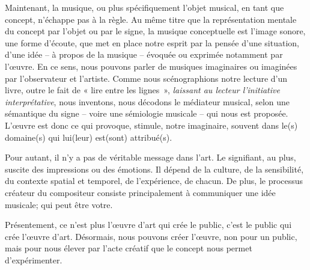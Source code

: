 Maintenant, la musique, ou plus spécifiquement l'objet musical, en tant que concept, n'échappe pas à la règle. Au même titre que la représentation mentale du concept par l'objet ou par le signe, la musique conceptuelle est l'image sonore, une forme d'écoute, que met en place notre esprit par la pensée d'une situation, d'une idée -- à propos de la musique -- évoquée ou exprimée notamment par l'œuvre. 
En ce sens, nous pouvons parler de musiques imaginaires ou imaginées par l'observateur et l'artiste. Comme nous scénographions notre lecture d'un livre, outre le fait de « lire entre les \hbox{lignes »}, \textit{laissant au lecteur l'initiative interprétative}, %
nous inventons, nous décodons le médiateur musical, selon une sémantique du signe -- voire une sémiologie musicale -- qui nous est proposée. L'œuvre est donc ce qui provoque, stimule, notre imaginaire, souvent dans le(s) domaine(s) qui lui(leur) est(sont) attribué(s). 
 
 Pour autant, il n'y a pas de véritable message dans l'art. Le signifiant, au plus, suscite des impressions ou des émotions. Il dépend de la culture, de la sensibilité, du contexte spatial et temporel, de l'expérience, de chacun.  De plus, le processus créateur du compositeur consiste principalement à communiquer une idée musicale; qui peut être votre.

Présentement, ce n’est plus l’œuvre d’art qui crée le public, c’est le public qui crée l’œuvre d’art. Désormais, nous pouvons créer l'œuvre, non pour un public, mais pour nous élever par l'acte créatif que le concept nous permet d'expérimenter.

